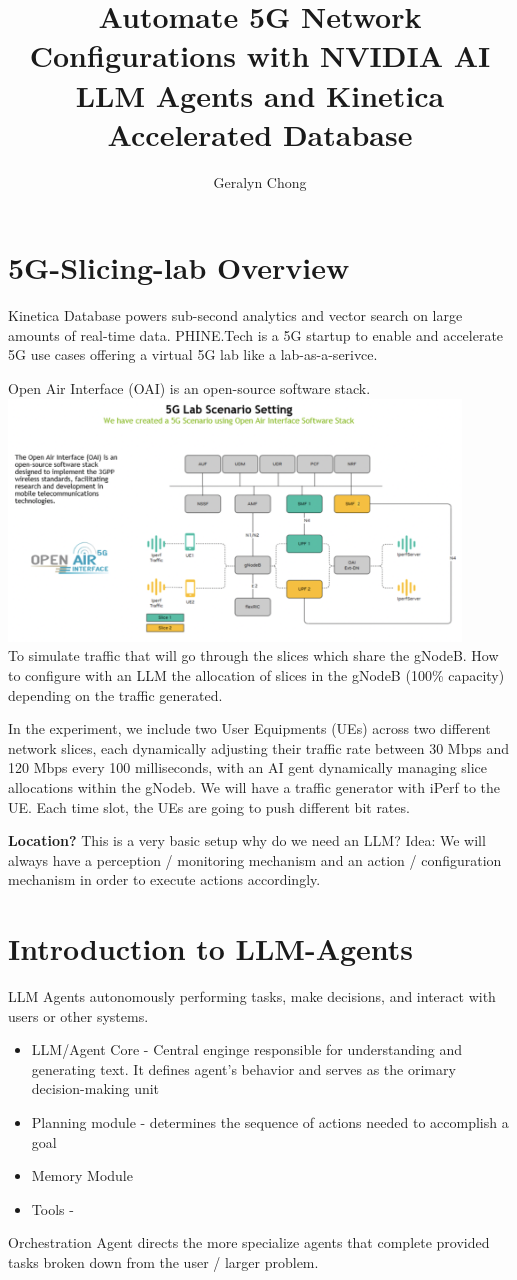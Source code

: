 \documentclass{article}
\title{Automate 5G Network Configurations with NVIDIA AI LLM Agents and Kinetica Accelerated Database}
\author{Geralyn Chong}
\begin{document}
\maketitle
\tableofcontents
\section{5G-Slicing-lab Overview}
Kinetica Database powers sub-second analytics and vector search on large amounts of real-time data. PHINE.Tech is a 5G startup to enable and accelerate 5G use cases offering a virtual 5G lab like a lab-as-a-serivce. 

Open Air Interface (OAI) is an open-source software stack. \\\includegraphics[width=0.9\textwidth]{../images/5glab.png}\\ To simulate traffic that will go through the slices which share the gNodeB. How to configure with an LLM the allocation of slices in the gNodeB (100\% capacity) depending on the traffic generated. 

In the experiment, we include two User Equipments (UEs) across two different network slices, each dynamically adjusting their traffic rate between 30 Mbps and 120 Mbps every 100 milliseconds, with an AI gent dynamically managing slice allocations within the gNodeb. We will have a traffic generator with iPerf to the UE. Each time slot, the UEs are going to push different bit rates. 

\textbf{Location?} This is a very basic setup why do we need an LLM? Idea: We will always have a perception / monitoring mechanism and an action / configuration mechanism in order to execute actions accordingly. 
\section{Introduction to LLM-Agents}
LLM Agents autonomously performing tasks, make decisions, and interact with users or other systems. \begin{itemize}
    \item LLM/Agent Core - Central enginge responsible for understanding and generating text. It defines agent's behavior and serves as the orimary decision-making unit
    \item Planning module - determines the sequence of actions needed to accomplish a goal
    \item Memory Module
    \item Tools - 
\end{itemize}
Orchestration Agent directs the more specialize agents that complete provided tasks broken down from the user / larger problem. 
\end{document}
